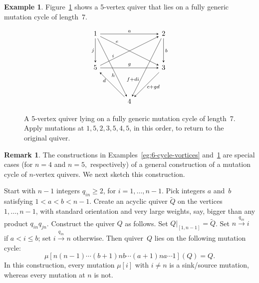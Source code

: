 \documentclass[11pt, letterpaper]{amsart}
\theoremstyle{definition}
\newtheorem{remark}[theorem]{Remark}
\newtheorem{example}[theorem]{Example}
\numberwithin{equation}{section}
\newcommand{\T}[2]{\mu[#1](#2)} %
\newcommand{\points}{\!\dasharrow\!}
\begin{document}
\newpage

\begin{example}
\label{eg:7-cycle}
Figure~\ref{fig:7-cycle} shows a 5-vertex quiver that lies on a fully generic mutation cycle of length~7. 
\end{example}

\begin{figure}[ht]
\vspace{-.1in}
\begin{equation*}
\begin{tikzcd}[arrows={-stealth}, sep=3.5em]
  1  \arrow[rr,  "a"] \arrow[drr, "e",  near start, outer sep=-1]  \arrow[ddr, "h", swap, pos=0.6, outer sep=-1.8]  \arrow[d, "j", swap, outer sep=-0.5]
  & & 2  \arrow[d, "b"] \arrow[ddl, "f+di", swap, near end, outer sep=-1.8] \arrow[dll, "i", swap, near end, outer sep=-1, stealth-]
  \\
   5 
  & & 3  \arrow[ll, "g", swap, stealth-] \arrow[dl, "c+gd", outer sep=-1.8]\\
  & 4 \arrow[ul, "d",  near end, outer sep=-1.8]
\end{tikzcd}
\end{equation*}
\vspace{-.1in}
\caption{
A 5-vertex quiver lying on a fully generic mutation cycle of length~7.
Apply mutations at $1, 5, 2, 3, 5, 4, 5$, in this order, to return to the original quiver. 
}
\label{fig:7-cycle}
\vspace{-.2in}
\end{figure}

\begin{remark}
The constructions in Examples~\ref{eg:6-cycle-vortices} and~\ref{eg:7-cycle} are special cases (for $n=4$ and $n=5,$ respectively) of a general construction of a mutation cycle of $n$-vertex quivers. We next sketch this construction.

Start with $n-1$ integers $q_{in} \ge 2$, for $i=1,\dots,n-1$.
Pick integers $a$ and~$b$ satisfying $1 \!<\! a \!<\! b \!< \!n\!-\!1$.
Create an acyclic quiver $\tilde Q$ on the vertices $1,\dots,n\!-\!1$, with standard orientation and very large weights, 
say, bigger than any product $q_{in} q_{jn}$. 
Construct the quiver $Q$ as follows.
Set $Q|_{[1,n-1]} = \tilde Q$.
Set $n\stackrel{q_{in}}{\longrightarrow} i$ if $a<i\le b$; set $i\stackrel{q_{in}}{\longrightarrow} n$ otherwise. 
Then quiver~$Q$ lies on the following mutation cycle: 
\[
\T{n (n-1) \cdots (b+1) n b \cdots (a+1) n a \cdots 1}{Q} = Q.
\]
In this construction, every mutation $\mu[i]$ with $i \neq n$ is a sink/source mutation, whereas every mutation at $n$ is not.
\end{remark}
\end{document}
